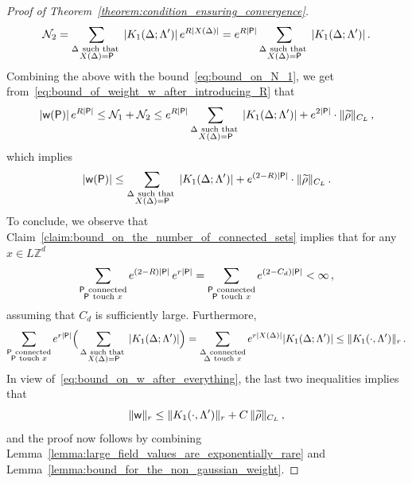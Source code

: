 \documentclass[11pt]{article}
\theoremstyle{definition}
\theoremstyle{remark}
\numberwithin{theorem}{section}
\def\La{{\Lambda}}
\newcommand{\bZ}{\mathbb Z}
\begin{document}
\begin{proof}[Proof of Theorem~\ref{theorem:condition_ensuring_convergence}]
    \[
    \mathcal{N}_2 =  \sum_{ \substack{\Delta \  \text{such that } \\ X(\Delta) = {\sf P}} }  |K_1(\Delta;\La^\prime)| \,  e^{R|X(\Delta)|} =  e^{R|{\sf P}|} \sum_{ \substack{\Delta \  \text{such that } \\ X(\Delta) = {\sf P}} }  |K_1(\Delta;\La^\prime)| \, .
    \]
    Combining the above with the bound~\eqref{eq:bound_on_N_1}, we get from~\eqref{eq:bound_of_weight_w_after_introducing_R} that 
    \[
    |{\sf w}({\sf P})| \, e^{R|{\sf P}|}  \le  \mathcal{N}_1 + \mathcal{N}_2 \le  e^{R|{\sf P}|} \sum_{ \substack{\Delta \  \text{such that } \\ X(\Delta) = {\sf P}} }  |K_1(\Delta;\La^\prime)| + e^{2|{\sf P}|} \cdot \| \widetilde \rho \|_{C_L} \, ,
    \]
    which implies
    \begin{equation}\label{eq:bound_on_w_after_everything}
        |{\sf w}({\sf P})| \le \sum_{ \substack{\Delta \  \text{such that } \\ X(\Delta) = {\sf P}} }  |K_1(\Delta;\La^\prime)| + e^{(2-R)|{\sf P}|} \cdot \| \widetilde \rho \|_{C_L} \, .
    \end{equation}
    To conclude, we observe that Claim~\ref{claim:bound_on_the_number_of_connected_sets} implies that for any $x\in L\bZ^d$
    \[
    \sum_{\substack{{\sf P} \ \text{connected} \\ {\sf P} \  \text{touch } x }} e^{(2-R)|{\sf P}|} \,  e^{r|{\sf P}|} = \sum_{\substack{{\sf P} \ \text{connected} \\ {\sf P} \  \text{touch } x }} e^{(2-C_d)|{\sf P}|} < \infty \, , 
    \]
    assuming that $C_d$ is sufficiently large. Furthermore,  
    \[
    \sum_{\substack{{\sf P} \ \text{connected} \\ {\sf P} \  \text{touch } x }}  e^{r|{\sf P}|} \Big( \sum_{ \substack{\Delta \  \text{such that } \\ X(\Delta) = {\sf P}} }  |K_1(\Delta;\La^\prime)| \Big) =  \sum_{\substack{\Delta \ \text{connected} \\ \Delta \  \text{touch } x }} e^{r|X(\Delta)|} |K_1(\Delta;\La^\prime)| \le \| K_1(\cdot , \La^\prime) \|_r \, .
    \]
    In view of~\eqref{eq:bound_on_w_after_everything}, the last two inequalities implies that 
    \[
    \| {\sf w} \|_r \le \| K_1(\cdot , \La^\prime) \|_r + C \, \| \widetilde \rho \|_{C_L} \, ,
    \]
    and the proof now follows by combining Lemma~\ref{lemma:large_field_values_are_exponentially_rare} and Lemma~\ref{lemma:bound_for_the_non_gaussian_weight}. 
    \end{proof}
    
\end{document}
